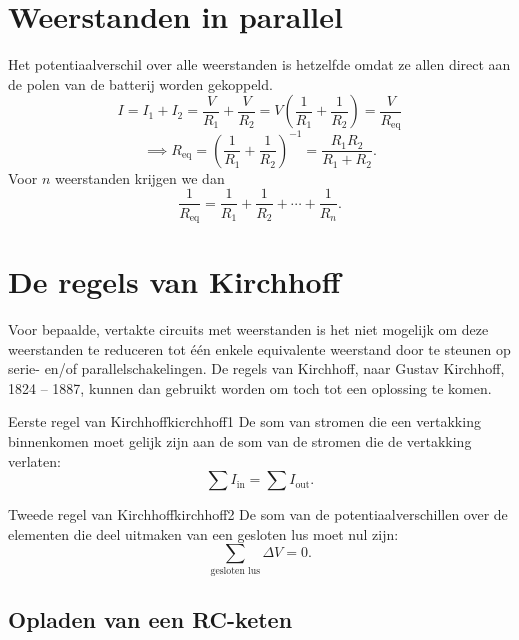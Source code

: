 \section{Weerstanden in parallel}

Het potentiaalverschil over alle weerstanden is hetzelfde omdat ze allen direct aan de polen van de batterij worden gekoppeld.
\[
    I = I_1 + I_2 = \frac{V}{R_1} + \frac{V}{R_2} = V\left(\frac{1}{R_1}+\frac{1}{R_2}\right) = \frac{V}{R_{\text{eq}}}
\]
\[
    \implies R_{\text{eq}} = {\left(\frac{1}{R_1}+\frac{1}{R_2}\right)}^{-1} = \frac{R_1R_2}{R_1 + R_2}.
\]
Voor $n$ weerstanden krijgen we dan
\[
    \frac{1}{R_{\text{eq}}} = \frac{1}{R_1} + \frac{1}{R_2} + \cdots + \frac{1}{R_n}.
\]


\section{De regels van Kirchhoff}

Voor bepaalde, vertakte circuits met weerstanden is het niet mogelijk om deze weerstanden te reduceren tot één enkele equivalente weerstand door te steunen op serie- en/of parallelschakelingen.
De regels van Kirchhoff, naar Gustav Kirchhoff, 1824 – 1887, kunnen dan gebruikt worden om toch tot een oplossing te komen.

\begin{stelling}{Eerste regel van Kirchhoff}{kicrchhoff1}
    De som van stromen die een vertakking binnenkomen moet gelijk zijn aan de som van de stromen die de vertakking verlaten:
    \[
        \sum I_{\text{in}} = \sum I_{\text{out}}.
    \]
\end{stelling}

\begin{stelling}{Tweede regel van Kirchhoff}{kirchhoff2}
    De som van de potentiaalverschillen over de elementen die deel uitmaken van een gesloten lus moet nul zijn:
    \[
        \sum_{\text{gesloten lus}} \Delta V = 0.
    \]
\end{stelling}


\subsection{Opladen van een RC-keten}

